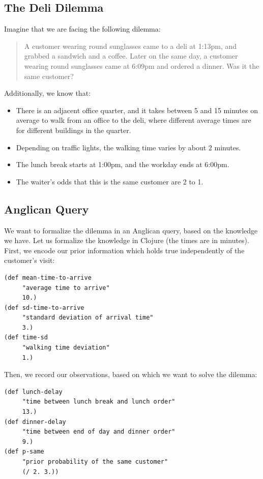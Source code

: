 \documentclass[preprint]{sigplanconf}
\begin{document}
\subsection{The Deli Dilemma}
\label{seq:deli}

Imagine that we are facing the following dilemma:
\begin{quote}
A customer wearing round sunglasses came to a deli at 1:13pm,
and grabbed a sandwich and a coffee. Later on the same day, a
customer wearing round sunglasses came at 6:09pm and ordered a
dinner.  Was it the same customer?
\end{quote}
Additionally, we know that:
\begin{itemize}
    \item There is an adjacent office quarter, and it takes
        between 5 and 15 minutes on average to walk from an
        office to the deli, where different average times are  for
        different buildings in the quarter.
    \item Depending on traffic lights, the walking time varies by about 2
        minutes.
    \item The lunch break starts at 1:00pm, and the workday ends at 6:00pm.
    \item The waiter's odds that this is the same customer are 2 to 1.
\end{itemize}

\subsection{Anglican Query}
\label{seq:deli-query}

We want to formalize the dilemma in an Anglican query, based on
the knowledge we have. Let us formalize the knowledge in
Clojure (the times are in minutes). First, we encode our prior
information which holds true independently of the customer's
visit:

\begin{lstlisting}[style=default]
(def mean-time-to-arrive
     "average time to arrive"
     10.)
(def sd-time-to-arrive
     "standard deviation of arrival time"
     3.)
(def time-sd
     "walking time deviation"
     1.)
\end{lstlisting}

Then, we record our observations, based on which we want to
solve the dilemma:

\begin{lstlisting}[style=default]
(def lunch-delay
     "time between lunch break and lunch order"
     13.)
(def dinner-delay
     "time between end of day and dinner order"
     9.)
(def p-same
     "prior probability of the same customer"
     (/ 2. 3.))
\end{lstlisting}
\end{document}
